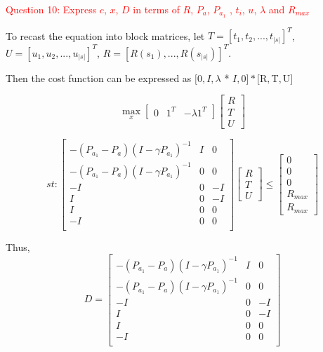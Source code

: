 \documentclass[11pt]{article}
\begin{document}
\textcolor{red}{
    Question 10: Express $c$, $x$, $D$ in terms of $R$, $P_{a}$, $P_{a_{1}}$ , $t_{i}$, $u$, $\lambda$ and $R_{max}$
}

To recast the equation into block matrices, let $T = [t_{1}, t_{2},...,t_{|s|}]^T$, $U = [u_{1}, u_{2},...,u_{|s|}]^T$, 
$R = [R(s_{1}),...,R(s_{|s|})]^T$. 

Then the cost function can be expressed as $[0, I,$$\lambda$ * $I$$, 0] * [$R$,$T$,$U$]$

$$\max\limits_{x} 
\left[
 \begin{matrix}
   0 & 1^T & -\lambda 1^T
  \end{matrix}
  \right] \left[
 \begin{matrix}
   R \\
   T \\ 
   U
  \end{matrix}
  \right] 
$$


$$ st:
\left[
 \begin{matrix}
   -(P_{a_1} - P_{a})(I- \gamma P_{a_1})^{-1}  & I & 0 \\
   -(P_{a_1} - P_{a})(I- \gamma P_{a_1})^{-1}  & 0 & 0 \\
   -I & 0 & -I \\
   I & 0 & -I \\
   I & 0 & 0 \\
   -I & 0 & 0 \\
  \end{matrix}
  \right] \left[
 \begin{matrix}
   R \\
   T \\ 
   U
  \end{matrix}
  \right] \le 
  \left[
  \begin{matrix}
   0 \\
   0 \\ 
   0 \\
   R_{max} \\
   R_{max}
  \end{matrix}
  \right]
$$
 
Thus,
$$ D = 
 \left[
 \begin{matrix}
   -(P_{a_1} - P_{a})(I- \gamma P_{a_1})^{-1}  & I & 0 \\
   -(P_{a_1} - P_{a})(I- \gamma P_{a_1})^{-1}  & 0 & 0 \\
   -I & 0 & -I \\
   I & 0 & -I \\
   I & 0 & 0 \\
   -I & 0 & 0 \\
  \end{matrix}
  \right]
$$
\end{document}
